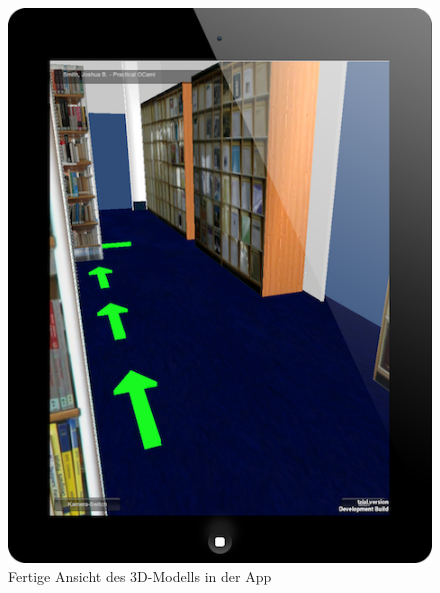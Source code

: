 \begin{figure}[htb]
\centering
\includegraphics[scale=0.83]{figures/ipad-navi}
\caption{Fertige Ansicht des 3D-Modells in der App}
\label{fig:ipad-navi}
\end{figure}